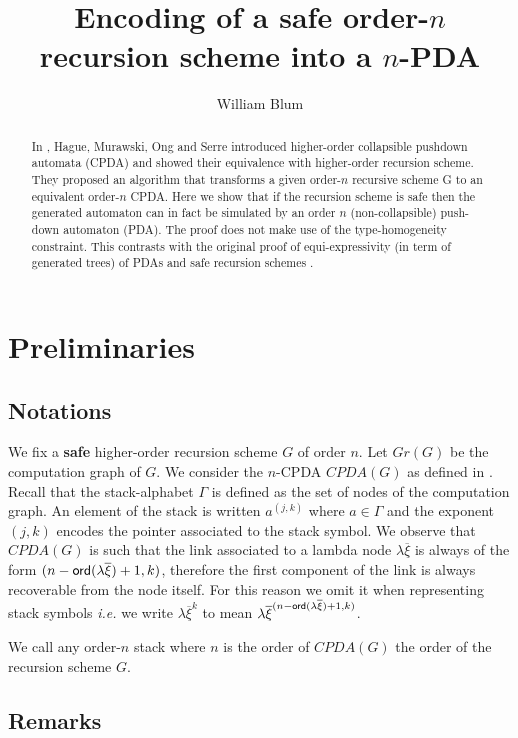 \documentclass{article}
\author{William Blum}
\title{Encoding of a safe order-$n$ recursion scheme into a $n$-PDA}
\theoremstyle{remark}
\theoremstyle{definition}
\begin{document}
\maketitle
\begin{abstract}
In \cite{hague-sto07}, Hague, Murawski, Ong and Serre introduced
higher-order collapsible pushdown automata (CPDA) and showed their
equivalence with higher-order recursion scheme. They proposed an
algorithm that transforms a given order-$n$ recursive  scheme G to
an equivalent order-$n$ CPDA. Here we show that if the recursion
scheme is safe then the generated automaton can in fact be simulated by an order
$n$ (non-collapsible) push-down automaton (PDA). The proof does not make
use of the type-homogeneity constraint. This contrasts with the original proof
of equi-expressivity (in term of generated trees) of PDAs and safe recursion schemes \cite{KNU02}.
\end{abstract}


\section{Preliminaries}

\subsection{Notations}

We fix a {\bf safe} higher-order recursion scheme $G$ of order $n$. Let $Gr(G)$ be the computation graph of $G$.
We consider the $n$-CPDA $CPDA(G)$ as defined in \cite[Definition 5.2]{hague-sto07}.
Recall that the stack-alphabet $\Gamma$ is defined as the set of nodes of the computation graph.
An element of the stack is written $a^{(j,k)}$ where $a\in \Gamma$ and the exponent $(j,k)$
encodes the pointer associated to the stack symbol. We observe that $CPDA(G)$ is such that the link associated to a lambda node $\lambda \overline{\xi}$ is always of the form $(n-{\sf ord}(\lambda \overline{\xi})+1, k)$, therefore the first component of the link is always recoverable from the node itself. For this reason we omit it when representing stack symbols {\it i.e.} we write $\lambda \overline{\xi}^{k}$ to mean $\lambda \overline{\xi}^{(n-{\sf ord}(\lambda \overline{\xi})+1,k)}$.


We call  any order-$n$ stack where $n$ is the order
of $CPDA(G)$ \ie the order of the recursion scheme $G$.


\subsection{Remarks}
\end{document}
